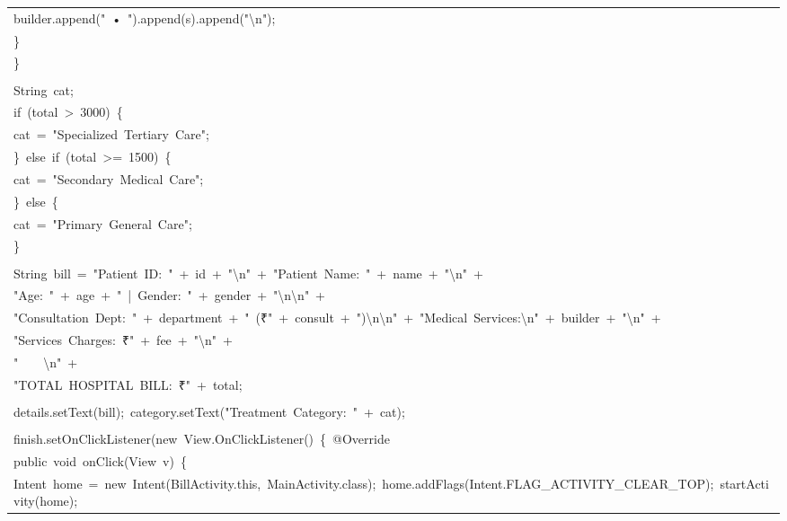 \documentclass[a4paper,12pt]{article}
\begin{document}
\begin{longtable}{|p{}|}
{\ttfamily\small builder.append("\ •\ ").append(s).append("\textbackslash{}n");} \\
{\ttfamily\small \}} \\
{\ttfamily\small \}} \\
\strut \\
{\ttfamily\small String\ cat;} \\
{\ttfamily\small if\ (total\ \textgreater{}\ 3000)\ \{} \\
{\ttfamily\small cat\ =\ "Specialized\ Tertiary\ Care";} \\
{\ttfamily\small \}\ else\ if\ (total\ \textgreater{}=\ 1500)\ \{} \\
{\ttfamily\small cat\ =\ "Secondary\ Medical\ Care";} \\
{\ttfamily\small \}\ else\ \{} \\
{\ttfamily\small cat\ =\ "Primary\ General\ Care";} \\
{\ttfamily\small \}} \\
\strut \\
{\ttfamily\small String\ bill\ =\ "Patient\ ID:\ "\ +\ id\ +\ "\textbackslash{}n"\ +\ "Patient\ Name:\ "\ +\ name\ +\ "\textbackslash{}n"\ +} \\
{\ttfamily\small "Age:\ "\ +\ age\ +\ "\ |\ Gender:\ "\ +\ gender\ +\ "\textbackslash{}n\textbackslash{}n"\ +} \\
{\ttfamily\small "Consultation\ Dept:\ "\ +\ department\ +\ "\ (₹"\ +\ consult\ +\ ")\textbackslash{}n\textbackslash{}n"\ +\ "Medical\ Services:\textbackslash{}n"\ +\ builder\ +\ "\textbackslash{}n"\ +} \\
{\ttfamily\small "Services\ Charges:\ ₹"\ +\ fee\ +\ "\textbackslash{}n"\ +} \\
{\ttfamily\small "\ \ \ \ \textbackslash{}n"\ +} \\
{\ttfamily\small "TOTAL\ HOSPITAL\ BILL:\ ₹"\ +\ total;} \\
\strut \\
{\ttfamily\small details.setText(bill);\ category.setText("Treatment\ Category:\ "\ +\ cat);} \\
\strut \\
{\ttfamily\small finish.setOnClickListener(new\ View.OnClickListener()\ \{\ @Override} \\
{\ttfamily\small public\ void\ onClick(View\ v)\ \{} \\
{\ttfamily\small Intent\ home\ =\ new\ Intent(BillActivity.this,\ MainActivity.class);\ home.addFlags(Intent.FLAG\_ACTIVITY\_CLEAR\_TOP);\ startActivity(home);} \\

\end{longtable}
\end{document}
